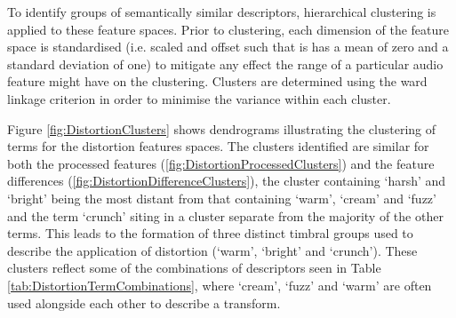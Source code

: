 		To identify groups of semantically similar descriptors, hierarchical clustering is applied to these feature
		spaces. Prior to clustering, each dimension of the feature space is standardised (i.e. scaled and offset
		such that is has a mean of zero and a standard deviation of one) to mitigate any effect the range of a
		particular audio feature might have on the clustering. Clusters are determined using the ward linkage
		criterion \citep{ward1963hierarchical} in order to minimise the variance within each cluster.

		Figure \ref{fig:DistortionClusters} shows dendrograms illustrating the clustering of terms for the
		distortion features spaces. The clusters identified are similar for both the processed features
		(\ref{fig:DistortionProcessedClusters}) and the feature differences
		(\ref{fig:DistortionDifferenceClusters}), the cluster containing `harsh' and `bright' being the most
		distant from that containing `warm', `cream' and `fuzz' and the term `crunch' siting in a cluster separate
		from the majority of the other terms. This leads to the formation of three distinct timbral groups used to
		describe the application of distortion (`warm', `bright' and `crunch'). These clusters reflect some of
		the combinations of descriptors seen in Table \ref{tab:DistortionTermCombinations}, where `cream', `fuzz'
		and `warm' are often used alongside each other to describe a transform.

